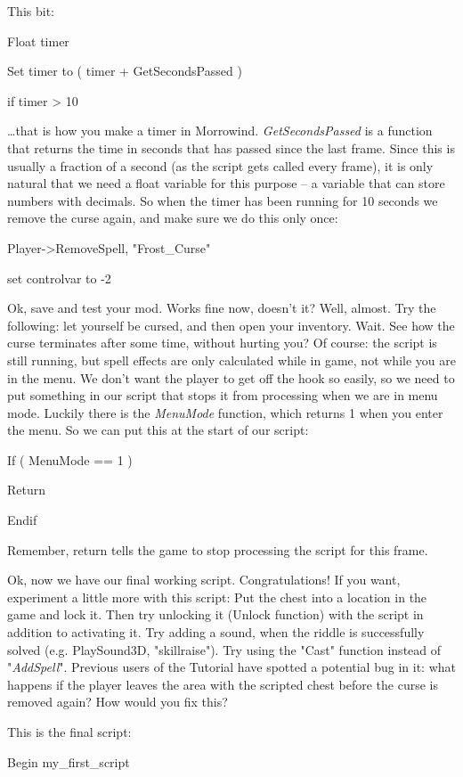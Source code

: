 \documentclass[
]{article}
\begin{document}
This bit:

Float timer

Set timer to ( timer + GetSecondsPassed )

if timer \textgreater{} 10

\ldots that is how you make a timer in Morrowind.
\emph{GetSecondsPassed} is a function that returns the time in seconds
that has passed since the last frame. Since this is usually a fraction
of a second (as the script gets called every frame), it is only natural
that we need a float variable for this purpose -- a variable that can
store numbers with decimals. So when the timer has been running for 10
seconds we remove the curse again, and make sure we do this only once:

Player-\textgreater RemoveSpell, "Frost\_Curse"

set controlvar to -2

Ok, save and test your mod. Works fine now, doesn't it? Well, almost.
Try the following: let yourself be cursed, and then open your inventory.
Wait. See how the curse terminates after some time, without hurting you?
Of course: the script is still running, but spell effects are only
calculated while in game, not while you are in the menu. We don't want
the player to get off the hook so easily, so we need to put something in
our script that stops it from processing when we are in menu mode.
Luckily there is the \emph{MenuMode} function, which returns 1 when you
enter the menu. So we can put this at the start of our script:

If ( MenuMode == 1 )

Return

Endif

Remember, return tells the game to stop processing the script for this
frame.

Ok, now we have our final working script. Congratulations! If you want,
experiment a little more with this script: Put the chest into a location
in the game and lock it. Then try unlocking it (Unlock function) with
the script in addition to activating it. Try adding a sound, when the
riddle is successfully solved (e.g. PlaySound3D, "skillraise"). Try
using the "Cast" function instead of "\emph{AddSpell}". Previous users
of the Tutorial have spotted a potential bug in it: what happens if the
player leaves the area with the scripted chest before the curse is
removed again? How would you fix this?

This is the final script:

Begin my\_first\_script
\end{document}
